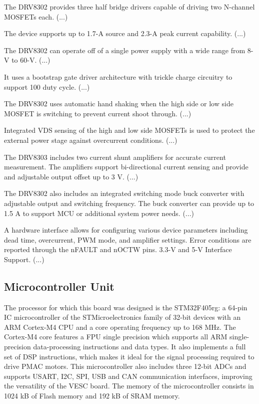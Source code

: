 The DRV8302 provides three half bridge drivers capable of driving two N-channel MOSFETs each. (...)

The device supports up to 1.7-A source and 2.3-A peak current capability. (...)

The DRV8302 can operate off of a single power supply with a wide range from 8-V to 60-V. (...)

It uses a bootstrap gate driver architecture with trickle charge circuitry to support 100 duty cycle. (...)

The DRV8302 uses automatic hand shaking when the high side or low side MOSFET is switching to prevent current shoot through. (...)

Integrated VDS sensing of the high and low side MOSFETs is used to protect the external power stage against overcurrent conditions. (...)

The DRV8303 includes two current shunt amplifiers for accurate current measurement. The amplifiers support bi-directional current sensing and provide and adjustable output offset up to 3 V. (...)

The DRV8302 also includes an integrated switching mode buck converter with adjustable output and switching frequency. The buck converter can provide up to 1.5 A to support MCU or additional system power needs. (...)

A hardware interface allows for configuring various device parameters including dead time, overcurrent, PWM mode, and amplifier settings. Error conditions are reported through the nFAULT and nOCTW pins. 3.3-V and 5-V Interface Support. (...)


\subsection{Microcontroller Unit}

The processor for which this board was designed is the STM32F405rg: a 64-pin IC microcontroller of the STMicroelectronics family of 32-bit devices with an ARM Cortex-M4 CPU and a core operating frequency up to 168 MHz. The Cortex-M4 core features a \acf{FPU} single precision which supports all ARM single-precision data-processing instructions and data types. It also implements a full set of \acf{DSP} instructions, which makes it ideal for the signal processing required to drive \ac{PMAC} motors. This microcontroller also includes three 12-bit \ac{ADC}s and supports USART, I2C, SPI, USB and CAN communication interfaces, improving the versatility of the VESC board. The memory of the microcontroller consists in 1024 kB of Flash memory and 192 kB of SRAM memory.



